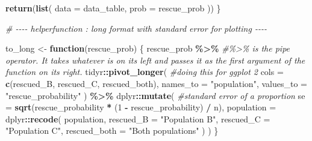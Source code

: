 \documentclass[
]{article}
\newenvironment{Shaded}{\begin{snugshade}}{\end{snugshade}}
\newcommand{\AttributeTok}[1]{\textcolor[rgb]{0.13,0.29,0.53}{#1}}
\newcommand{\CommentTok}[1]{\textcolor[rgb]{0.56,0.35,0.01}{\textit{#1}}}
\newcommand{\ControlFlowTok}[1]{\textcolor[rgb]{0.13,0.29,0.53}{\textbf{#1}}}
\newcommand{\DecValTok}[1]{\textcolor[rgb]{0.00,0.00,0.81}{#1}}
\newcommand{\FunctionTok}[1]{\textcolor[rgb]{0.13,0.29,0.53}{\textbf{#1}}}
\newcommand{\NormalTok}[1]{#1}
\newcommand{\OtherTok}[1]{\textcolor[rgb]{0.56,0.35,0.01}{#1}}
\newcommand{\SpecialCharTok}[1]{\textcolor[rgb]{0.81,0.36,0.00}{\textbf{#1}}}
\newcommand{\StringTok}[1]{\textcolor[rgb]{0.31,0.60,0.02}{#1}}
\begin{document}
\begin{Shaded}
\begin{Highlighting}[]
  \FunctionTok{return}\NormalTok{(}\FunctionTok{list}\NormalTok{(}
    \AttributeTok{data =}\NormalTok{ data\_table,}
    \AttributeTok{prob =}\NormalTok{ rescue\_prob}
\NormalTok{  ))}
\NormalTok{\}}


\CommentTok{\# {-}{-}{-}{-} helperfunction : long format with standard error for plotting {-}{-}{-}{-}}

\NormalTok{to\_long }\OtherTok{\textless{}{-}} \ControlFlowTok{function}\NormalTok{(rescue\_prob) \{}
\NormalTok{  rescue\_prob }\SpecialCharTok{\%\textgreater{}\%}         \CommentTok{\#\%\textgreater{}\% is the pipe operator. It takes whatever is on its left and passes it as the first argument of the function on its right.}
\NormalTok{    tidyr}\SpecialCharTok{::}\FunctionTok{pivot\_longer}\NormalTok{(   }\CommentTok{\#doing this for ggplot 2 }
      \AttributeTok{cols =} \FunctionTok{c}\NormalTok{(rescued\_B, rescued\_C, rescued\_both),}
      \AttributeTok{names\_to =} \StringTok{"population"}\NormalTok{,}
      \AttributeTok{values\_to =} \StringTok{"rescue\_probability"}   
\NormalTok{    ) }\SpecialCharTok{\%\textgreater{}\%}
\NormalTok{    dplyr}\SpecialCharTok{::}\FunctionTok{mutate}\NormalTok{(}
      \CommentTok{\#standard error of a proportion}
      \AttributeTok{se =} \FunctionTok{sqrt}\NormalTok{(rescue\_probability }\SpecialCharTok{*}\NormalTok{ (}\DecValTok{1} \SpecialCharTok{{-}}\NormalTok{ rescue\_probability) }\SpecialCharTok{/}\NormalTok{ n),}
      \AttributeTok{population =}\NormalTok{ dplyr}\SpecialCharTok{::}\FunctionTok{recode}\NormalTok{(}
\NormalTok{        population,}
        \AttributeTok{rescued\_B    =} \StringTok{"Population B"}\NormalTok{,}
        \AttributeTok{rescued\_C    =} \StringTok{"Population C"}\NormalTok{,}
        \AttributeTok{rescued\_both =} \StringTok{"Both populations"}
\NormalTok{      )}
\NormalTok{    )}
\NormalTok{\}}
\end{Highlighting}
\end{Shaded}
\end{document}
